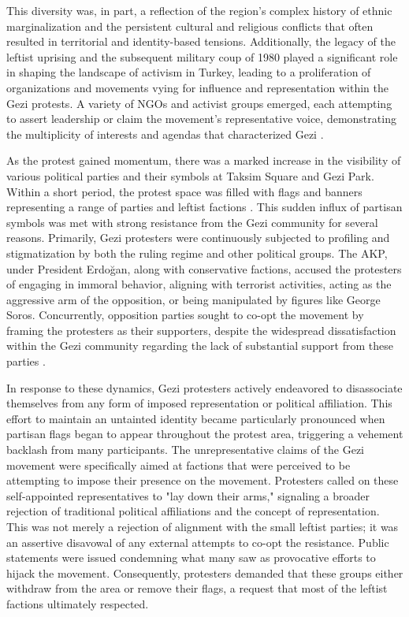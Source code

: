 This diversity was, in part, a reflection of the region’s complex history of ethnic marginalization and the persistent cultural and religious conflicts that often resulted in territorial and identity-based tensions. Additionally, the legacy of the leftist uprising and the subsequent military coup of 1980 played a significant role in shaping the landscape of activism in Turkey, leading to a proliferation of organizations and movements vying for influence and representation within the Gezi protests. A variety of NGOs and activist groups emerged, each attempting to assert leadership or claim the movement’s representative voice, demonstrating the multiplicity of interests and agendas that characterized Gezi \parencite[see 229]{defneover2017}.

As the protest gained momentum, there was a marked increase in the visibility of various political parties and their symbols at Taksim Square and Gezi Park. Within a short period, the protest space was filled with flags and banners representing a range of parties and leftist factions \parencite{2023v}. This sudden influx of partisan symbols was met with strong resistance from the Gezi community for several reasons. Primarily, Gezi protesters were continuously subjected to profiling and stigmatization by both the ruling regime and other political groups. The AKP, under President Erdoğan, along with conservative factions, accused the protesters of engaging in immoral behavior, aligning with terrorist activities, acting as the aggressive arm of the opposition, or being manipulated by figures like George Soros. Concurrently, opposition parties sought to co-opt the movement by framing the protesters as their supporters, despite the widespread dissatisfaction within the Gezi community regarding the lack of substantial support from these parties \parencite[see 100-110]{tufekci2020}.

In response to these dynamics, Gezi protesters actively endeavored to disassociate themselves from any form of imposed representation or political affiliation. This effort to maintain an untainted identity became particularly pronounced when partisan flags began to appear throughout the protest area, triggering a vehement backlash from many participants. The unrepresentative claims of the Gezi movement were specifically aimed at factions that were perceived to be attempting to impose their presence on the movement. Protesters called on these self-appointed representatives to "lay down their arms," signaling a broader rejection of traditional political affiliations and the concept of representation. This was not merely a rejection of alignment with the small leftist parties; it was an assertive disavowal of any external attempts to co-opt the resistance. Public statements were issued condemning what many saw as provocative efforts to hijack the movement. Consequently, protesters demanded that these groups either withdraw from the area or remove their flags, a request that most of the leftist factions ultimately respected.

